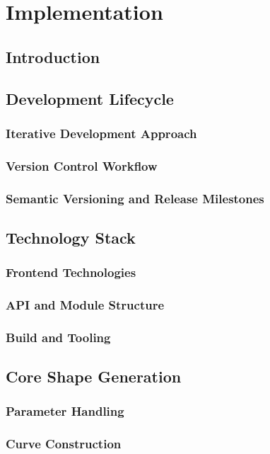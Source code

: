 \chapter{Implementation}

\section{Introduction}

\section{Development Lifecycle}
\subsection{Iterative Development Approach}
\subsection{Version Control Workflow}
\subsection{Semantic Versioning and Release Milestones}

\section{Technology Stack}
\subsection{Frontend Technologies}
\subsection{API and Module Structure}
\subsection{Build and Tooling}

\section{Core Shape Generation}
\subsection{Parameter Handling}
\subsection{Curve Construction}
